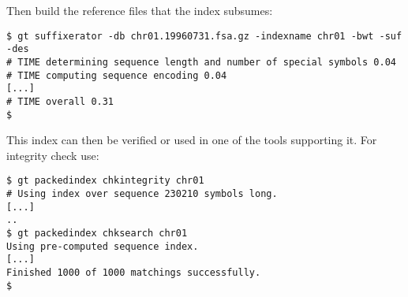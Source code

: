 \documentclass[12pt,titlepage]{article}
\begin{document}
Then build the reference files that the index subsumes:
\begin{footnotesize}
\begin{verbatim}
$ gt suffixerator -db chr01.19960731.fsa.gz -indexname chr01 -bwt -suf -des
# TIME determining sequence length and number of special symbols 0.04
# TIME computing sequence encoding 0.04
[...]
# TIME overall 0.31
$
\end{verbatim}
\end{footnotesize}

This index can then be verified or used in one of the tools supporting
it. For integrity check use:
\begin{footnotesize}
\begin{verbatim}
$ gt packedindex chkintegrity chr01
# Using index over sequence 230210 symbols long.
[...]
..
$ gt packedindex chksearch chr01
Using pre-computed sequence index.
[...]
Finished 1000 of 1000 matchings successfully.
$
\end{verbatim}
\end{footnotesize}



\end{document}
